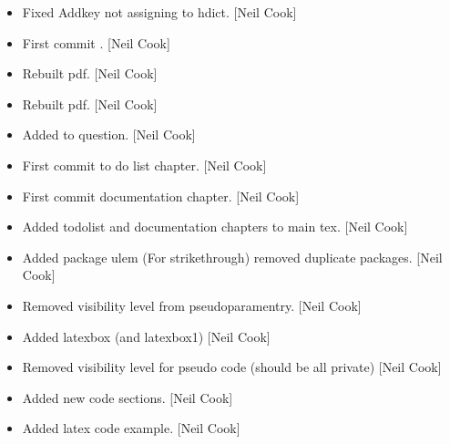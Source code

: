 \documentclass[a4paper,10pt,english]{report}
\begin{document}
\begin{itemize}
\item {} 
Fixed Addkey not assigning to hdict. {[}Neil Cook{]}

\item {} 
First commit . {[}Neil Cook{]}

\item {} 
Rebuilt pdf. {[}Neil Cook{]}

\item {} 
Rebuilt pdf. {[}Neil Cook{]}

\item {} 
Added to question. {[}Neil Cook{]}

\item {} 
First commit to do list chapter. {[}Neil Cook{]}

\item {} 
First commit documentation chapter. {[}Neil Cook{]}

\item {} 
Added todolist and documentation chapters to main tex. {[}Neil Cook{]}

\item {} 
Added package ulem (For strikethrough) removed duplicate packages.
{[}Neil Cook{]}

\item {} 
Removed visibility level from pseudoparamentry. {[}Neil Cook{]}

\item {} 
Added latexbox (and latexbox1) {[}Neil Cook{]}

\item {} 
Removed visibility level for pseudo code (should be all private) {[}Neil
Cook{]}

\item {} 
Added new code sections. {[}Neil Cook{]}

\item {} 
Added latex code example. {[}Neil Cook{]}

\end{itemize}
\end{document}
